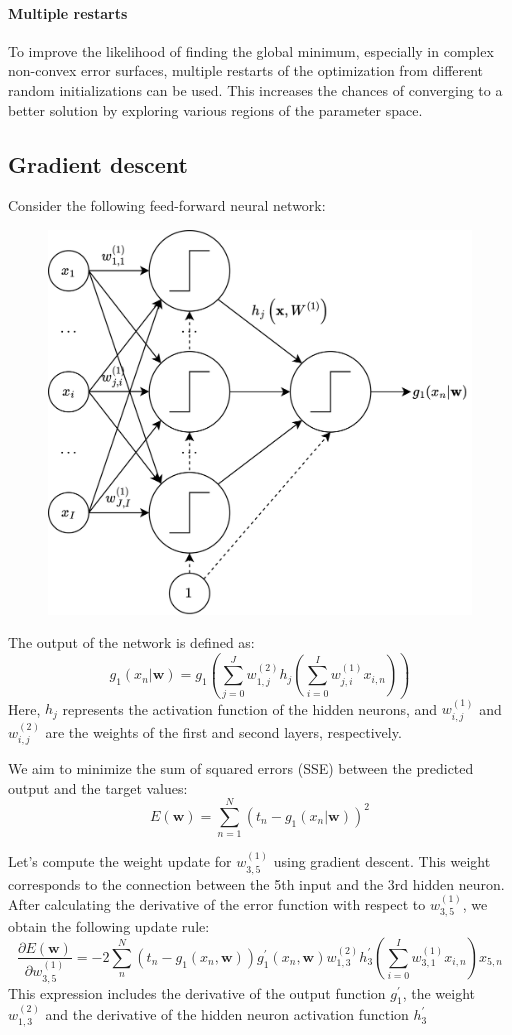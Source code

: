 \paragraph*{Multiple restarts}
To improve the likelihood of finding the global minimum, especially in complex non-convex error surfaces, multiple restarts of the optimization from different random initializations can be used. 
This increases the chances of converging to a better solution by exploring various regions of the parameter space.

\subsection{Gradient descent}
\begin{example}
    Consider the following feed-forward neural network:
    \begin{figure}[H]
        \centering
        \includegraphics[width=0.60\linewidth]{images/ffnn1.png}
    \end{figure}
    The output of the network is defined as:
    \[g_1(x_n|\mathbf{w})=g_1\left(\sum_{j=0}^Jw_{1,j}^{(2)}h_j\left(\sum_{i=0}^Iw_{j,i}^{(1)}x_{i,n}\right)\right)\]
    Here, $h_j$ represents the activation function of the hidden neurons, and $w_{i,j}^{(1)}$ and $w_{i,j}^{(2)}$ are the weights of the first and second layers, respectively.

    We aim to minimize the sum of squared errors (SSE) between the predicted output and the target values:
    \[E(\mathbf{w})=\sum_{n=1}^N\left(t_n-g_1(x_n|\mathbf{w})\right)^2\]

    Let's compute the weight update for $w_{3,5}^{(1)}$ using gradient descent. 
    This weight corresponds to the connection between the 5th input and the 3rd hidden neuron.
    After calculating the derivative of the error function with respect to $w_{3,5}^{(1)}$, we obtain the following update rule: 
    \[\dfrac{\partial E(\mathbf{w})}{\partial w_{3,5}^{(1)}}=-2\sum_n^N(t_n-g_1(x_n,\mathbf{w}))g_1^\prime(x_n,\mathbf{w})w_{1,3}^{(2)}h^\prime_3\left(\sum_{i=0}^Iw_{3,1}^{(1)}x_{i,n}\right)x_{5,n}\]
    This expression includes the derivative of the output function $g^\prime_1$, the weight $w_{1,3}^{(2)}$ and the derivative of the hidden neuron activation function $h^\prime_3$
\end{example}
